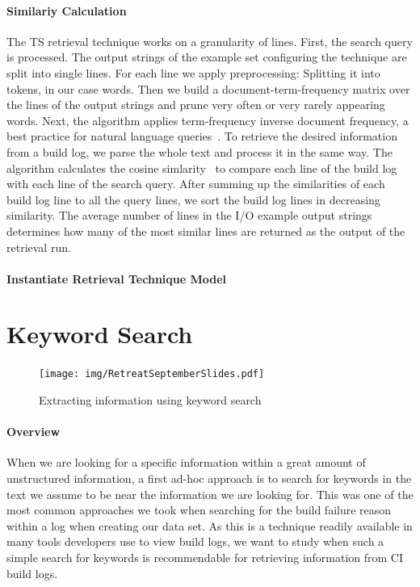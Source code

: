 \documentclass[\myrootdir/main.tex]{subfiles}
\begin{document}
\paragraph{Similariy Calculation}
The TS retrieval technique works on a granularity of lines.
First, the search query is processed.
The output strings of the example set configuring the technique are split into single lines.
For each line we apply preprocessing: Splitting it into tokens, in our case words.
Then we build a document-term-frequency matrix over the lines of the output strings and prune very often or very rarely appearing words.
Next, the algorithm applies term-frequency inverse document frequency, a best practice for natural language queries~\cite{lee1997document}.
To retrieve the desired information from a build log, we parse the whole text and process it in the same way.
The algorithm calculates the cosine simlarity~ to compare each line of the build log with each line of the search query.
After summing up the similarities of each build log line to all the query lines, we sort the build log lines in decreasing similarity.
The average number of lines in the I/O example output strings determines how many of the most similar lines are returned as the output of the retrieval run.

\paragraph{Instantiate Retrieval Technique Model}



\section{Keyword Search}
\begin{figure}[h]
  \centering
\texttt{[image: img/RetreatSeptemberSlides.pdf]}
  \caption{Extracting information using keyword search}
  \label{fig:keword-search-explanation}
\end{figure}

\paragraph{Overview}
When we are looking for a specific information within a great amount of unstructured information, a first ad-hoc approach is to search for keywords in the text we assume to be near the information we are looking for.
This was one of the most common approaches we took when searching for the build failure reason within a log when creating our data set.
As this is a technique readily available in many tools developers use to view build logs, we want to study when such a simple search for keywords is recommendable for retrieving information from CI build logs.
\end{document}

